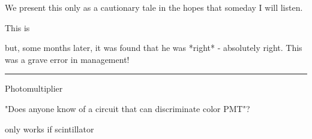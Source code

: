 \documentclass[paper.tex]{subfiles}
\begin{document}
We present this only as a cautionary tale in the hopes that someday I will listen.

 This is 

but, some months later, it was found that he was *right* - absolutely right. This was a grave error in management!

\rule{\linewidth}{0.2pt}

Photomultiplier

"Does anyone know of a circuit that can discriminate color PMT"?

only works if scintillator


\end{document}
